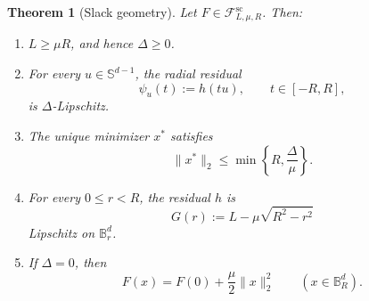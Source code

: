 \documentclass[11pt]{article}
\newcommand{\B}{\mathbb{B}}
\newcommand{\Sph}{\mathbb{S}}
\newcommand{\cF}{\mathcal{F}}
\newcommand{\norm}[1]{\lVert #1\rVert_2}
\theoremstyle{plain}
\newtheorem{theorem}{Theorem}[section]
\theoremstyle{definition}
\begin{document}
\begin{theorem}[Slack geometry]\label{thm:slack-geometry}
Let $F\in\cF^{\mathrm{sc}}_{L,\mu,R}$.  Then:
\begin{enumerate}[label=(\roman*),leftmargin=2.2em]
\item $L\ge\mu R$, and hence $\Delta\ge0$.
\item For every $u\in\Sph^{d-1}$, the radial residual
\[
   \psi_u(t):=h(tu),\qquad t\in[-R,R],
\]
is $\Delta$-Lipschitz.
\item The unique minimizer $x^*$ satisfies
\[
   \norm{x^*}\le \min\left\{R,\frac{\Delta}{\mu}\right\}.
\]
\item For every $0\le r<R$, the residual $h$ is
\[
   G(r):=L-\mu\sqrt{R^2-r^2}
\]
Lipschitz on $\B_r^d$.
\item If $\Delta=0$, then
\[
   F(x)=F(0)+\frac{\mu}{2}\norm{x}^2
   \qquad(x\in\B_R^d).
\]
\end{enumerate}
\end{theorem}
\end{document}
